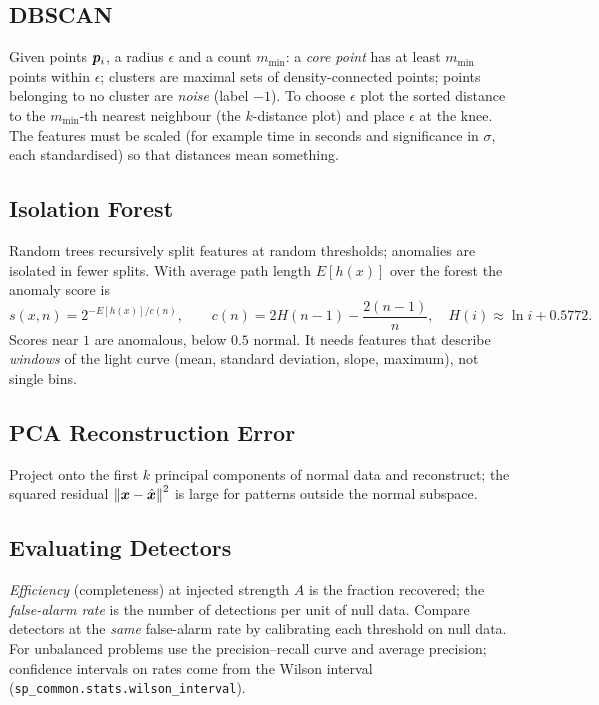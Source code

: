 \documentclass[11pt,a4paper]{article}
\begin{document}
\subsection{DBSCAN}
Given points $\bm{p}_i$, a radius $\epsilon$ and a count $m_{\min}$: a \emph{core point} has at least $m_{\min}$ points within $\epsilon$; clusters are maximal sets of density-connected points; points belonging to no cluster are \emph{noise} (label $-1$). To choose $\epsilon$ plot the sorted distance to the $m_{\min}$-th nearest neighbour (the $k$-distance plot) and place $\epsilon$ at the knee. The features must be scaled (for example time in seconds and significance in $\sigma$, each standardised) so that distances mean something.

\subsection{Isolation Forest}
Random trees recursively split features at random thresholds; anomalies are isolated in fewer splits. With average path length $E[h(x)]$ over the forest the anomaly score is
\begin{equation}
  s(x,n)=2^{-E[h(x)]/c(n)},\qquad c(n)=2H(n-1)-\frac{2(n-1)}n,\quad H(i)\approx\ln i+0.5772.
  \label{eq:iso}
\end{equation}
Scores near $1$ are anomalous, below $0.5$ normal. It needs features that describe \emph{windows} of the light curve (mean, standard deviation, slope, maximum), not single bins.

\subsection{PCA Reconstruction Error}
Project onto the first $k$ principal components of normal data and reconstruct; the squared residual $\left\lVert\bm{x}-\hat{\bm{x}}\right\rVert^2$ is large for patterns outside the normal subspace.

\subsection{Evaluating Detectors}
\emph{Efficiency} (completeness) at injected strength $A$ is the fraction recovered; the \emph{false-alarm rate} is the number of detections per unit of null data. Compare detectors at the \emph{same} false-alarm rate by calibrating each threshold on null data. For unbalanced problems use the precision--recall curve and average precision; confidence intervals on rates come from the Wilson interval (\texttt{sp\_common.stats.wilson\_interval}).
\end{document}
